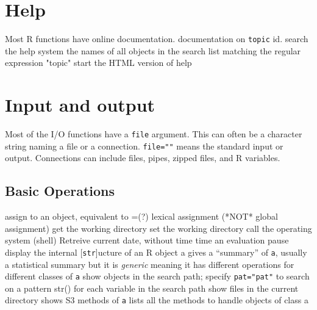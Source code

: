 
\def\content{\uppercase{r}}
\def\shortcontent{\content}
\def\versionnumber{1.3}  %
\def\version{v\versionnumber\ \month\ \year}


\mytitle

\shortintro
\shortintroR


\section{Help}{Most R functions have online documentation.}
	{documentation on {\tt topic}}
	{id.}
	{search the help system}
	{the names of all objects in the search list
    matching the regular ex\-pres\-sion "to\-pic"}
	{start the HTML version of help}

\section{Input and output}{Most of the I/O functions have a {\tt file}
argument. This can often be a character string naming a file or a connection.
{\tt file=""} means the standard input or output. Connections can include
files, pipes, zipped files, and R variables. }

\subsection{Basic Operations}{}
\cmdS{<-}	{assign to an object, equivalent to =(?)}
\cmdS{<<-}	{lexical assignment (*NOT* global assignment)}
	{get the working directory}
	{set the working directory}
	{call the operating system (shell)}
	{Retreive current date, without time}
	{time an evaluation}
	{pause}
	{display the internal [{\tt str}]ucture of an R object a}
	{gives a ``summary'' of {\tt a}, usually a statistical summary but it is {\it generic} meaning it has different operations for different classes of {\tt a}}
	{show objects in the search path; specify {\tt pat="pat"} to search on a pattern}
	{str() for each variable in the search path}
	{show files in the current directory}
	{shows S3 methods of {\tt a}}
	{lists all the methods to handle objects of class a}

